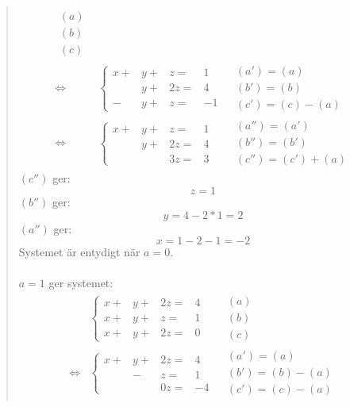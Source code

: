 \documentclass[a4paper]{article}
\begin{document}
\begin{quotation}
\begin{align*}
\begin{array}{l}
	(a) \\ 
	(b) \\
	(c)
	\end{array} \\ \Leftrightarrow
	&\left\{\begin{array}{rrrr}
	x+& y+& z=&1 \\
	  & y+&2z=&4 \\
	 -& y+& z=&-1
	\end{array} \right.
	&\begin{array}{l} 
	(a')=(a) \\ 
	(b')=(b) \\
	(c')=(c)-(a)
	\end{array} \\ \Leftrightarrow
	&\left\{\begin{array}{rrrr}
	x+& y+& z=&1 \\
	  & y+&2z=&4 \\
	  &   &3z=&3
	\end{array} \right.
	&\begin{array}{l} 
	(a'')=(a') \\ 
	(b'')=(b') \\
	(c'')=(c')+(a)
	\end{array}
	\end{align*}
	$(c'')$ ger:
	\[z=1\]
	$(b'')$ ger:
	\[y=4-2*1=2\]
	$(a'')$ ger:
	\[x=1-2-1=-2\]
	Systemet är entydigt när $a=0$.
	\\ \\
	$a=1$ ger systemet:
	\begin{align*}
	&\left\{\begin{array}{rrrr}
	x+&y+&2z=&4 \\
	x+&y+& z=&1 \\
	x+&y+&2z=&0
	\end{array} \right.
	&\begin{array}{l} 
	(a) \\ 
	(b) \\
	(c)
	\end{array} \\ \Leftrightarrow
	&\left\{\begin{array}{rrrr}
	x+&y+&2z=&4 \\
	  & -& z=&1 \\
	  &  &0z=&-4
	\end{array} \right.
	&\begin{array}{l} 
	(a')=(a) \\ 
	(b')=(b)-(a) \\
	(c')=(c)-(a)
	\end{array}

\end{align*}
\end{quotation}
\end{document}

